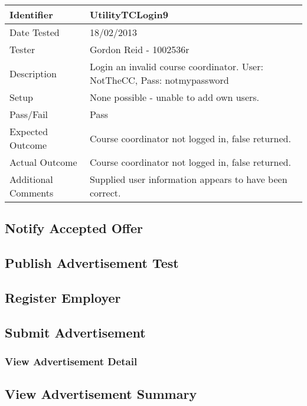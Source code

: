 \documentclass[11pt]{l3deliverable}
\begin{document}
\begin{tabularx}{\textwidth}{|T|L|}
\hline
Identifier & UtilityTCLogin9\\
\hline
Date Tested & 18/02/2013\\
\hline
Tester & Gordon Reid - 1002536r\\
\hline
Description & Login an invalid course coordinator. User: NotTheCC, Pass: 
notmypassword\\
\hline
Setup & None possible - unable to add own users.\\
\hline
Pass/Fail & Pass\\
\hline
Expected Outcome & Course coordinator not logged in, false returned.\\
\hline
Actual Outcome & Course coordinator not logged in, false returned.\\
\hline
Additional Comments & Supplied user information appears to have been correct.\\
\hline
\end{tabularx}

\newpage

\subsection{Notify Accepted Offer}

\newpage

\subsection{Publish Advertisement Test}

\newpage

\subsection{Register Employer}

\newpage

\subsection{Submit Advertisement}

\newpage

\subsubsection{View Advertisement Detail}

\newpage

\subsection{View Advertisement Summary}
\end{document}
